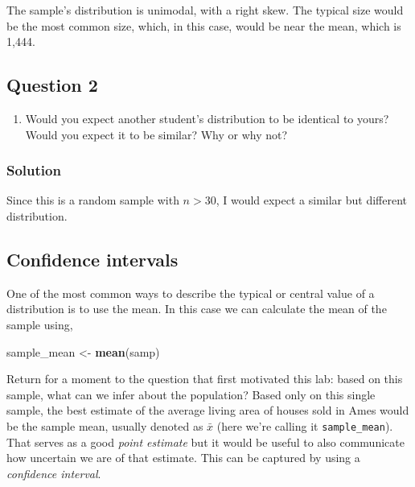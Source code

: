 \documentclass[]{article}
\newenvironment{Shaded}{\begin{snugshade}}{\end{snugshade}}
\newcommand{\KeywordTok}[1]{\textcolor[rgb]{0.13,0.29,0.53}{\textbf{#1}}}
\newcommand{\StringTok}[1]{\textcolor[rgb]{0.31,0.60,0.02}{#1}}
\newcommand{\NormalTok}[1]{#1}
\providecommand{\tightlist}{%
  \setlength{\itemsep}{0pt}\setlength{\parskip}{0pt}}
\begin{document}
The sample's distribution is unimodal, with a right skew. The typical
size would be the most common size, which, in this case, would be near
the mean, which is 1,444.

\subsection{Question 2}\label{question-2}

\begin{enumerate}
\def\labelenumi{\arabic{enumi}.}
\setcounter{enumi}{1}
\tightlist
\item
  Would you expect another student's distribution to be identical to
  yours? Would you expect it to be similar? Why or why not?
\end{enumerate}

\subsubsection{Solution}\label{solution-1}

Since this is a random sample with \(n > 30\), I would expect a similar
but different distribution.

\subsection{Confidence intervals}\label{confidence-intervals}

One of the most common ways to describe the typical or central value of
a distribution is to use the mean. In this case we can calculate the
mean of the sample using,

\begin{Shaded}
\begin{Highlighting}[]
\NormalTok{sample_mean <-}\StringTok{ }\KeywordTok{mean}\NormalTok{(samp)}
\end{Highlighting}
\end{Shaded}

Return for a moment to the question that first motivated this lab: based
on this sample, what can we infer about the population? Based only on
this single sample, the best estimate of the average living area of
houses sold in Ames would be the sample mean, usually denoted as
\(\bar{x}\) (here we're calling it \texttt{sample\_mean}). That serves
as a good \emph{point estimate} but it would be useful to also
communicate how uncertain we are of that estimate. This can be captured
by using a \emph{confidence interval}.
\end{document}
